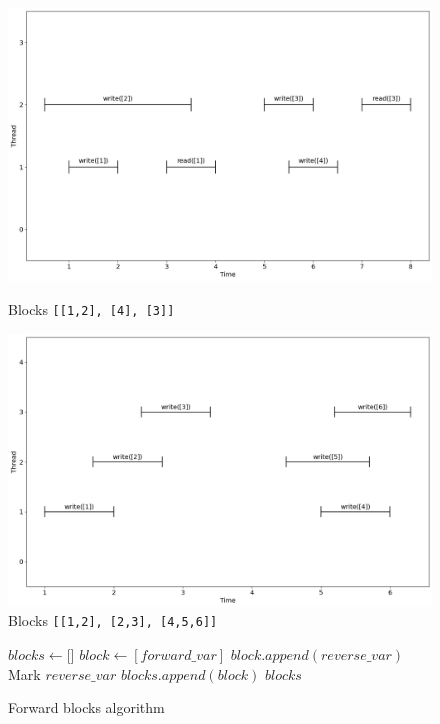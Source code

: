 \documentclass[oneside, a4paper, onecolumn, 10pt]{article}
\begin{document}
\begin{figure}[h]
  \centering
  \begin{minipage}{0.5\textwidth}
    \centering
    \includegraphics[width=\textwidth]{assets/forward_blocks.png}
    \caption{\label{Forward Blocks Example}Blocks \texttt{[[1,2], [4], [3]]}}
  \end{minipage}\hfill
  \begin{minipage}{0.5\textwidth}
    \centering
    \includegraphics[width=\textwidth]{assets/reversed_blocks.png}
    \caption{\label{Reverse Blocks Example}Blocks \texttt{[[1,2], [2,3], [4,5,6]]}}
  \end{minipage}
\end{figure}
\begin{figure}[h]
  \begin{algorithmic}
    \State $blocks \gets \texttt{[]}$
    \State $block \gets [forward\_var]$
    \State $block.append(reverse\_var)$
    \State Mark $reverse\_var$ \hfill {}
    \EndIf
    \EndFor
    \State $blocks.append(block)$
    \EndFor
    \State \Return $blocks$
    \EndFunction
  \end{algorithmic}
  \label{Forward Blocks Algorithm}
  \caption{Forward blocks algorithm}
\end{figure}
\end{document}
